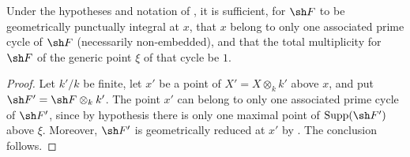 \begin{proposition}[4.7.13]
\label{IV.4.7.13}
Under the hypotheses and notation of , it is
sufficient, for $\sh F$ to be geometrically punctually integral at
$x$, that $x$ belong to only one associated prime cycle of $\sh F$
(necessarily non-embedded), and that the total multiplicity for
$\sh F$ of the generic point $\xi$ of that cycle be $1$.
\end{proposition}

\begin{proof}
Let $k'/k$ be finite, let $x'$ be a point of
$X'=X\otimes_k k'$ above $x$, and put
$\sh F'=\sh F\otimes_k k'$.
The point $x'$ can belong to only one associated prime cycle of
$\sh F'$, since by hypothesis there is only one maximal point of
$\operatorname{Supp}(\sh F')$ above $\xi$.
Moreover, $\sh F'$ is geometrically reduced at $x'$ by
.
The conclusion follows.
\end{proof}
